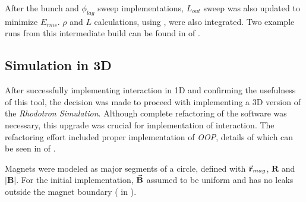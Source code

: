 \documentclass{book}
\begin{document}
After the bunch and $\phi_{lag}$ sweep implementations, $L_{out}$ sweep was also updated to minimize $E_{rms}$. $\rho$ and $L$ calculations, using , were also integrated. 
Two example runs from this intermediate build can be found in  of .

\subsection{Simulation in 3D}
After successfully implementing \eE interaction in 1D and confirming the usefulness of this tool, the decision was made to proceed with implementing a 3D version of the \textit{Rhodotron Simulation}.
Although complete refactoring of the software was necessary, this upgrade was crucial for implementation of \eB interaction.
The refactoring effort included proper implementation of \textit{OOP}, details of which can be seen in  of .

Magnets were modeled as major segments of a circle, defined with $\vec{\textbf{r}}_{mag}$, $\textbf{R}$ and $|\textbf{B}|$. 
For the initial implementation, $\vec{\textbf{B}}$ assumed to be uniform and has no leaks outside the magnet boundary ( in ).
\end{document}
